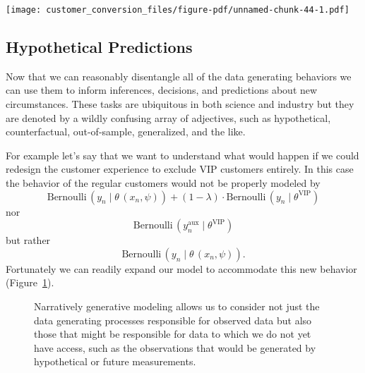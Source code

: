 \documentclass[
  letterpaper,
  DIV=11,
  numbers=noendperiod]{scrartcl}
\begin{document}
\texttt{[image: customer\_conversion\_files/figure-pdf/unnamed-chunk-44-1.pdf]}

\subsection{Hypothetical Predictions}\label{hypothetical-predictions}

Now that we can reasonably disentangle all of the data generating
behaviors we can use them to inform inferences, decisions, and
predictions about new circumstances. These tasks are ubiquitous in both
science and industry but they are denoted by a wildly confusing array of
adjectives, such as hypothetical, counterfactual, out-of-sample,
generalized, and the like.

For example let's say that we want to understand what would happen if we
could redesign the customer experience to exclude VIP customers
entirely. In this case the behavior of the regular customers would not
be properly modeled by \[
\text{Bernoulli} \, (y_{n} \mid \theta \, (x_{n}, \psi))
+ (1 - \lambda) \cdot
\text{Bernoulli} \, (y_{n} \mid \theta^{\text{VIP}})
\] nor \[
\text{Bernoulli} \, (y^{\text{aux}}_{n} \mid \theta^{\text{VIP}})
\] but rather \[
\text{Bernoulli} \, (y_{n} \mid \theta \, (x_{n}, \psi)).
\] Fortunately we can readily expand our model to accommodate this new
behavior (Figure~\ref{fig-model5}).

\begin{figure}


\caption{\label{fig-model5}Narratively generative modeling allows us to
consider not just the data generating processes responsible for observed
data but also those that might be responsible for data to which we do
not yet have access, such as the observations that would be generated by
hypothetical or future measurements.}

\end{figure}%
\end{document}
